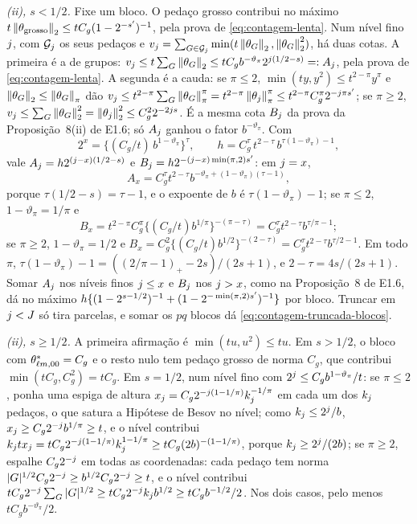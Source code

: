 \documentclass[11pt,a4paper]{article}
\newcommand{\Gcal}{\mathcal{G}}
\begin{document}
\emph{(ii), $s < 1/2$.} Fixe um bloco. O pedaço grosso contribui no máximo
$t\left\lVert \theta_{\mathrm{grosso}} \right\rVert_{2} \le tC_{g}(1-2^{-s'})^{-1}$, pela
prova de \eqref{eq:contagem-lenta}. Num nível fino $j$, com $\Gcal_{\lev}$
os seus pedaços e $v_{\lev} = \sum_{G\in\Gcal_{\lev}}\min(t\norm{\theta_{G}}_{2},
\norm{\theta_{G}}_{2}^{2})$, há duas cotas. A primeira é a de grupos:
$v_{j} \le t\sum_{G}\left\lVert \theta_{G} \right\rVert_{2} \le tC_{g}b^{-\vartheta_{\pi}}
2^{j(1/2-s)} =: A_{j}$, pela prova de \eqref{eq:contagem-lenta}. A
segunda é a cauda: se $\pi \le 2$, $\min(ty,y^{2}) \le t^{2-\pi}y^{\pi}$ e
$\left\lVert \theta_{G} \right\rVert_{2} \le \left\lVert \theta_{G} \right\rVert_{\pi}$ dão $v_{j} \le
t^{2-\pi}\sum_{G}\left\lVert \theta_{G} \right\rVert_{\pi}^{\pi} =
t^{2-\pi}\left\lVert \theta_{j} \right\rVert_{\pi}^{\pi} \le t^{2-\pi}C_{g}^{\pi}2^{-j\pi s'}$;
se $\pi \ge 2$, $v_{j} \le \sum_{G}\left\lVert \theta_{G} \right\rVert_{2}^{2} =
\left\lVert \theta_{j} \right\rVert_{2}^{2} \le C_{g}^{2}2^{-2j s}$. É a mesma cota $B_{j}$
da prova da Proposição~8(ii) de E1.6; só $A_{j}$ ganhou o fator
$b^{-\vartheta_{\pi}}$. Com
\[
  2^{x} = \bigl\{(C_{g}/t)\,b^{1-\vartheta_{\pi}}\bigr\}^{\tau},
  \qquad
  h = C_{g}^{\tau}\,t^{2-\tau}\,b^{\tau(1-\vartheta_{\pi})-1},
\]
vale $A_{j} = h2^{(j-x)(1/2-s)}$ e $B_{j} = h2^{-(j-x)\min(\pi,2)s'}$:
em $j = x$,
\[
  A_{x} = C_{g}^{\tau}t^{2-\tau}b^{-\vartheta_{\pi} + (1-\vartheta_{\pi})(\tau-1)},
\]
porque $\tau(1/2-s) = \tau - 1$, e o expoente de
$b$ é $\tau(1-\vartheta_{\pi}) - 1$; se $\pi \le 2$, $1 - \vartheta_{\pi} =
1/\pi$ e
\[
  B_{x} = t^{2-\pi}C_{g}^{\pi}\{(C_{g}/t)b^{1/\pi}\}^{-(\pi-\tau)} =
  C_{g}^{\tau}t^{2-\tau}b^{\tau/\pi-1};
\]
se $\pi \ge 2$, $1 - \vartheta_{\pi} =
1/2$ e $B_{x} = C_{g}^{2}\{(C_{g}/t)b^{1/2}\}^{-(2-\tau)} =
C_{g}^{\tau}t^{2-\tau}b^{\tau/2-1}$. Em todo $\pi$, $\tau(1-\vartheta_{\pi}) - 1 =
((2/\pi-1)_{+}-2s)/(2s+1)$, e $2 - \tau = 4s/(2s+1)$. Somar $A_{j}$ nos níveis
finos $j \le x$ e $B_{j}$ nos $j > x$, como na Proposição~8 de E1.6,
dá no máximo $h\{(1-2^{s-1/2})^{-1} + (1-2^{-\min(\pi,2)s'})^{-1}\}$ por
bloco. Truncar em $j < J$ só tira parcelas, e somar os $pq$ blocos dá
\eqref{eq:contagem-truncada-blocos}.

\emph{(ii), $s \ge 1/2$.} A primeira afirmação é $\min(tu,u^{2}) \le tu$. Em
$s > 1/2$, o bloco com $\theta^{*}_{\ell m,00} = C_{g}$ e o resto nulo tem
pedaço grosso de norma $C_{g}$, que contribui $\min(tC_{g},C_{g}^{2}) = tC_{g}$.
Em $s = 1/2$, num nível fino com $2^{j} \le C_{g}b^{1-\vartheta_{\pi}}/t$:
se $\pi \le 2$, ponha uma espiga de altura $x_{j} = C_{g}2^{-j(1-1/\pi)}
k_{j}^{-1/\pi}$ em cada um dos $k_{j}$ pedaços, o que satura a Hipótese de
Besov no nível; como $k_{j} \le 2^{j}/b$, $x_{j} \ge
C_{g}2^{-j}b^{1/\pi} \ge t$, e o nível contribui $k_{j}tx_{j} =
tC_{g}2^{-j(1-1/\pi)}k_{j}^{1-1/\pi} \ge tC_{g}(2b)^{-(1-1/\pi)}$, porque
$k_{j} \ge 2^{j}/(2b)$; se $\pi \ge 2$, espalhe $C_{g}2^{-j}$ em todas
as coordenadas: cada pedaço tem norma $|G|^{1/2}C_{g}2^{-j} \ge
b^{1/2}C_{g}2^{-j} \ge t$, e o nível contribui
$tC_{g}2^{-j}\sum_{G}|G|^{1/2} \ge tC_{g}2^{-j}k_{j}b^{1/2} \ge
tC_{g}b^{-1/2}/2$. Nos dois casos, pelo menos $tC_{g}b^{-\vartheta_{\pi}}/2$.
\end{document}
